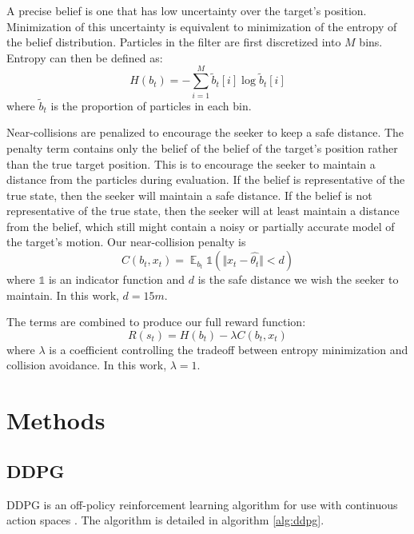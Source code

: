 \documentclass[10pt,twocolumn,letterpaper]{article}
\begin{document}
A precise belief is one that has low uncertainty over the target's position.
Minimization of this uncertainty is equivalent to minimization of the entropy of the belief distribution.
Particles in the filter are first discretized into $M$ bins.
Entropy can then be defined as:
\begin{equation}
H(b_t) = -\sum_{i = 1}^M\tilde{b}_t[i]\log\tilde{b}_t[i]
\label{entropy_unnormalized}
\end{equation}
where $\tilde{b}_t$ is the proportion of particles in each bin.

Near-collisions are penalized to encourage the seeker to keep a safe distance.
The penalty term contains only the belief of the belief of the target's position rather than the true target position.
This is to encourage the seeker to maintain a distance from the particles during evaluation.
If the belief is representative of the true state, then the seeker will maintain a safe distance.
If the belief is not representative of the true state, then the seeker will at least maintain a distance from the belief, which still might contain a noisy or partially accurate model of the target's motion.
Our near-collision penalty is
\begin{equation}
C(b_t, x_t) = \mathop{{}\mathbb{E}}_{b_t} \mathds{1} (\Vert x_t - \hat{\theta_t}\Vert < d)
\label{collision_penalty}
\end{equation}
where $\mathds{1}$ is an indicator function and $d$ is the safe distance we wish the seeker to maintain.
In this work, $d = 15m$.

The terms are combined to produce our full reward function:
\begin{equation}
R(s_t) = H(b_t) - \lambda C(b_t, x_t)
\label{reward_function}
\end{equation}
where $\lambda$ is a coefficient controlling the tradeoff between entropy minimization and collision avoidance.
In this work, $\lambda = 1$.

\section{Methods}

\subsection{DDPG}
DDPG is an off-policy reinforcement learning algorithm for use with continuous action spaces \cite{ddpg}.
The algorithm is detailed in algorithm \ref{alg:ddpg}.
\end{document}

